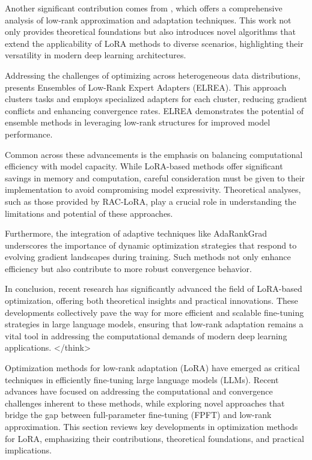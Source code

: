 \documentclass[conference]{IEEEtran}
\begin{document}
Another significant contribution comes from \cite{bX}, which offers a comprehensive analysis of low-rank approximation and adaptation techniques. This work not only provides theoretical foundations but also introduces novel algorithms that extend the applicability of LoRA methods to diverse scenarios, highlighting their versatility in modern deep learning architectures.

Addressing the challenges of optimizing across heterogeneous data distributions, \cite{bX} presents Ensembles of Low-Rank Expert Adapters (ELREA). This approach clusters tasks and employs specialized adapters for each cluster, reducing gradient conflicts and enhancing convergence rates. ELREA demonstrates the potential of ensemble methods in leveraging low-rank structures for improved model performance.

Common across these advancements is the emphasis on balancing computational efficiency with model capacity. While LoRA-based methods offer significant savings in memory and computation, careful consideration must be given to their implementation to avoid compromising model expressivity. Theoretical analyses, such as those provided by RAC-LoRA, play a crucial role in understanding the limitations and potential of these approaches.

Furthermore, the integration of adaptive techniques like AdaRankGrad underscores the importance of dynamic optimization strategies that respond to evolving gradient landscapes during training. Such methods not only enhance efficiency but also contribute to more robust convergence behavior.

In conclusion, recent research has significantly advanced the field of LoRA-based optimization, offering both theoretical insights and practical innovations. These developments collectively pave the way for more efficient and scalable fine-tuning strategies in large language models, ensuring that low-rank adaptation remains a vital tool in addressing the computational demands of modern deep learning applications.
</think>

Optimization methods for low-rank adaptation (LoRA) have emerged as critical techniques in efficiently fine-tuning large language models (LLMs). Recent advances have focused on addressing the computational and convergence challenges inherent to these methods, while exploring novel approaches that bridge the gap between full-parameter fine-tuning (FPFT) and low-rank approximation. This section reviews key developments in optimization methods for LoRA, emphasizing their contributions, theoretical foundations, and practical implications.
\end{document}
